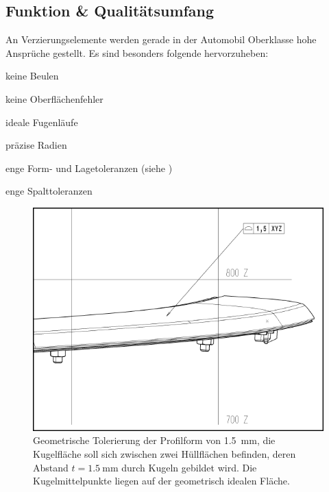 \documentclass[12pt,a4paper,parskip,twoside,BCOR5mm,headsepline]{scrartcl}
\begin{document}
\subsection{Funktion \& Qualitätsumfang}
An Verzierungselemente werden gerade in der Automobil Oberklasse  hohe Ansprüche gestellt. Es sind besonders folgende hervorzuheben:
\begin{itemize*}
\item keine Beulen
\item keine Oberflächenfehler
\item ideale Fugenläufe
\item präzise Radien
\item enge Form- und Lagetoleranzen (siehe )
\item enge Spalttoleranzen
\end{itemize*}
\begin{figure}[hbtp]
  \centering
  \includegraphics[width=.8\textwidth]{vdkdtol}
  \caption{Geometrische Tolerierung der Profilform von \SI{1.5}{\milli\meter}, die Kugelfläche soll sich zwischen zwei Hüllflächen befinden, deren Abstand $ t = \SI{1,5}{\milli\meter}$ durch Kugeln gebildet wird. Die Kugelmittelpunkte liegen auf der geometrisch idealen Fläche.   \autocite[113]{tm} }
  \label{fig:vdkdtol}
  \end{figure}
  
\end{document}
